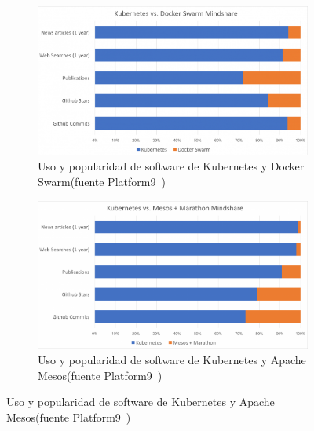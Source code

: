 \begin{figure}[!htb]
  \centering
  \begin{subfigure}[t]{.45\textwidth}
    \centering
    \label{fig:KubernetesSwarm}
    \includegraphics[width=\textwidth]{fig/KubernetesSwarm}
    \caption{Uso y popularidad de software de Kubernetes y Docker Swarm(fuente Platform9~\cite{KubernetesSwarm})}
  \end{subfigure}
  \hfill
  \begin{subfigure}[t]{.45\textwidth}
    \centering
    \label{fig:KubernetesMesos}
    \includegraphics[width=\textwidth]{fig/KubernetesMesos}
    \caption{Uso y popularidad de software de Kubernetes y Apache Mesos(fuente Platform9~\cite{KubernetesMesos})}
  \end{subfigure}
\end{figure}

